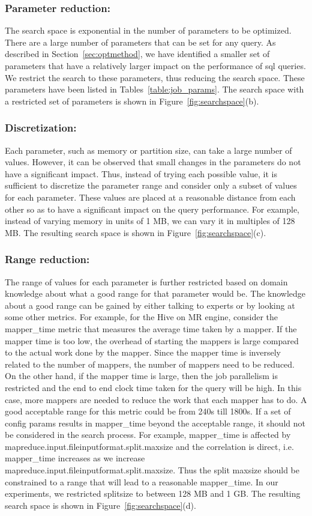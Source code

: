 \noindent\subsubsection*{\bf Parameter reduction: }
\label{sec:paramreduction}
The search space is exponential in the number of parameters to be optimized. There are a large number of parameters that can be set for any query. As described in Section~\ref{sec:optmethod}, we have identified a smaller set of parameters that have a relatively larger impact on the performance of sql queries. We restrict the search to these parameters, thus reducing the search space. These parameters have been listed in Tables~\ref{table:job_params}. The search space with a restricted set of parameters is shown in Figure~\ref{fig:searchspace}(b).
\noindent\subsubsection*{\bf Discretization: }
Each parameter, such as memory or partition size, can take a large number of values. However, it can be observed that small changes in the parameters do not have a significant impact. Thus, instead of trying each possible value, it is sufficient to discretize the parameter range and consider only a subset of values for each parameter. These values are placed at a reasonable distance from each other so as to have a significant impact on the query performance. For example, instead of varying memory in units of 1 MB, we can vary it in multiples of 128 MB. The resulting search space is shown in Figure~\ref{fig:searchspace}(c).
\noindent\subsubsection*{\bf Range reduction: }
The range of values for each parameter is further restricted based on domain knowledge about what a good range for that parameter would be.  The knowledge about a good range can be gained by either talking to experts or by looking at some other metrics. For example, for the Hive on MR engine, consider the mapper\_time metric that measures the average time taken by a mapper. If the mapper time is too low, the overhead of starting the mappers is large compared to the actual work done by the mapper. Since the mapper time is inversely related to the number of mappers, the number of mappers need to be reduced. On the other hand, if the mapper time is large, then the job parallelism is restricted and the end to end clock time taken for the query will be high. In this case, more mappers are needed to reduce the work that each mapper has to do. A good acceptable range for this metric could be from 240s till 1800s.  If a set of config params results in mapper\_time beyond the acceptable range, it should not be considered in the search process. For example, mapper\_time is affected by mapreduce.input.fileinputformat.split.maxsize and the correlation is direct, i.e. mapper\_time  increases as we increase mapreduce.input.fileinputformat.split.maxsize.  Thus the split maxsize should be constrained to a range that will lead to a reasonable mapper\_time. In our experiments, we restricted splitsize to between 128 MB and 1 GB. The resulting search space is shown in Figure~\ref{fig:searchspace}(d).
